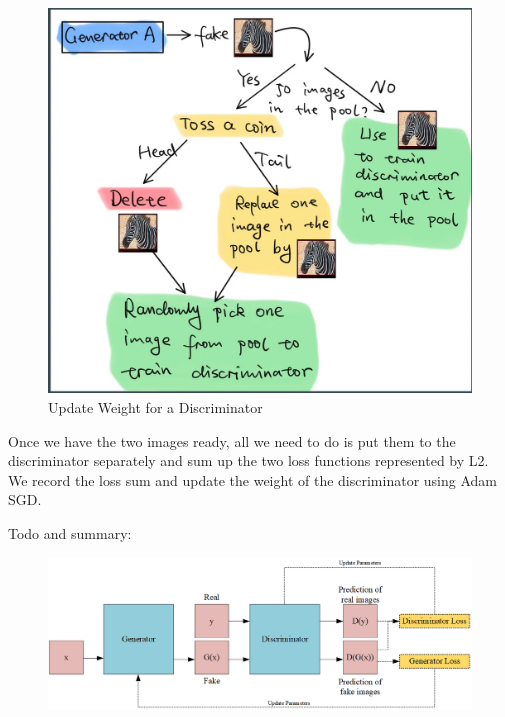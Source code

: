 \documentclass[
]{article}
\begin{document}
\begin{figure}
\centering
\includegraphics{./assets/Update_Weight_for_a_Discriminator.png}
\caption{Update Weight for a Discriminator}
\end{figure}

Once we have the two images ready, all we need to do is put them to the
discriminator separately and sum up the two loss functions represented
by L2. We record the loss sum and update the weight of the discriminator
using Adam SGD.

\newpage

Todo and summary:

\begin{figure}
\centering
\includegraphics{./assets/GAN.png}
\caption{}
\end{figure}
\end{document}
